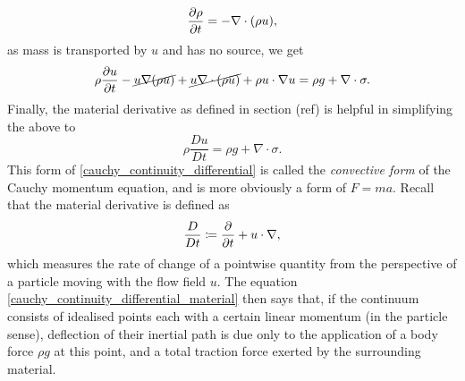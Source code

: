 $$\frac{\partial \rho}{\partial t} = -\nabla\cdot(\rho u),$$
as mass is transported by $u$ and has no source, we get
$$
    \rho\frac{\partial u}{\partial t} -\cancel{u\nabla(\rho u)} + \cancel{u\nabla\cdot (\rho u)} + \rho u\cdot\nabla u = \rho g + \nabla\cdot\sigma.
$$
Finally, the material derivative as defined in section (ref) is helpful in simplifying the above to
\begin{equation}\label{cauchy_continuity_differential_material}
    \rho\frac{Du}{Dt} = \rho g + \nabla\cdot\sigma.
\end{equation}
This form of \eqref{cauchy_continuity_differential} is called the \textit{convective form} of the Cauchy momentum equation, and is more obviously a form of $F = ma$.
Recall that the material derivative is defined as
    $$\frac{D}{Dt} \coloneqq \frac{\partial }{\partial t} + u\cdot \nabla,$$
which measures the rate of change of a pointwise quantity from the perspective of a particle moving with the flow field $u$.
The equation \eqref{cauchy_continuity_differential_material} then says that, if the continuum consists of idealised points
each with a certain linear momentum (in the particle sense), deflection of their inertial path is due only to the application
of a body force $\rho g$ at this point, and a total traction force exerted by the surrounding material.
